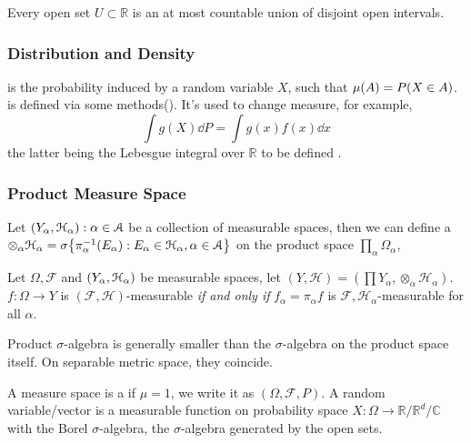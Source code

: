 \begin{thm}
    Every open set \(U \subset \mathbb{R}\) is an at most countable union of disjoint open intervals. 
\end{thm}
\subsubsection{Distribution and Density}

 is the probability induced by a random variable \(X\), such that \(\mu(A) = P\pqty{X \in A}\).  is defined via some methods(). It's used to change measure, for example,
\begin{equation*}
    \int g(X) \dd{P} = \int g(x)f(x)\dd{x}
\end{equation*}
the latter being the Lebesgue integral over \(\mathbb{R}\) to be defined .

\subsubsection{Product Measure Space}

Let \(\pqty{Y_{\alpha}, \mathcal{H}_{\alpha}}: \alpha\in \mathcal{A} \) be a collection of measurable spaces, then we can define a  \(\otimes_{\alpha} \mathcal{H}_{\alpha} = \sigma\Bqty{\pi_{\alpha}^{-1} (E_{\alpha}): E_{\alpha} \in \mathcal{H}_{\alpha}, \alpha \in \mathcal{A}}\) on the product space \(\prod_{\alpha} \Omega_{\alpha}\),  
\begin{proposition}
    Let \(\Omega, \mathcal{F}\) and \(\pqty{Y_{\alpha}, \mathcal{H}_{\alpha}}\) be measurable spaces, let \((Y, \mathcal{H}) = (\prod Y_{\alpha}, \otimes_{\alpha} \mathcal{H}_{\alpha})\). \(f : \Omega \to Y\) is \((\mathcal{F}, \mathcal{H})\)-measurable \textit{if and only if} \(f_{\alpha} = \pi_{\alpha} f\) is \(\mathcal{F} ,\mathcal{H}_{\alpha}\)-measurable for all \(\alpha\).
\end{proposition} 

\begin{proposition}
    Product \(\sigma\)-algebra is generally smaller than the \(\sigma\)-algebra on the product space itself. On separable metric space, they coincide. 
\end{proposition}

A measure space is a  if \(\mu =1\), we write it as \((\Omega, \mathcal{F}, P)\). A random variable/vector is a measurable function on probability space \(X: \Omega \to \mathbb{R}/\mathbb{R}^{d}/\mathbb{C}\) with the Borel \(\sigma\)-algebra, the \(\sigma\)-algebra generated by the open sets.


